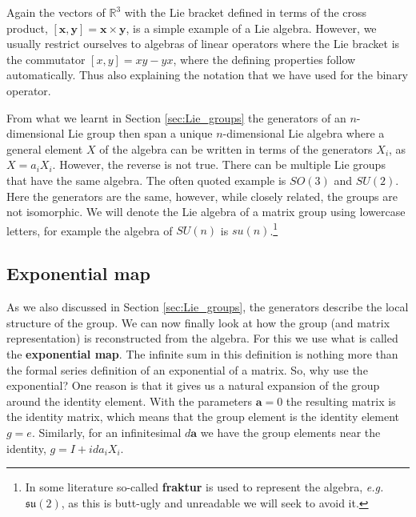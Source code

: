 \documentclass[notes.tex]{subfiles}
\begin{document}
Again the vectors of $\mathbb{R}^3$ with the Lie bracket defined in terms of the cross product, $[\mathbf x, \mathbf y]=\mathbf x \times \mathbf y$, is a simple example of a Lie algebra. However, we usually restrict ourselves to algebras of linear operators where the Lie bracket is the commutator $[x,y] = xy-yx$, where the defining properties follow automatically. Thus also explaining the notation that we have used for the binary operator. 

From what we learnt in Section \ref{sec:Lie_groups} the generators of an $n$-dimensional Lie group then span a unique $n$-dimensional Lie algebra where a general element $X$ of the algebra can be written in terms of the generators $X_i$, as $X=a_iX_i$. However, the reverse is not true. There can be multiple Lie groups that have the same algebra. The often quoted example is $SO(3)$ and $SU(2)$. Here the generators are the same, however, while closely related, the groups are not isomorphic. We will denote the Lie algebra of a matrix group using lowercase letters, for example the algebra of $SU(n)$ is $su(n)$.\footnote{In some literature so-called {\bf fraktur} is used to represent the algebra, {\it e.g.}\ $\mathfrak{su(2)}$, as this is butt-ugly and unreadable we will seek to avoid it. }

\subsection{Exponential map}
\label{sec:expmap}
As we also discussed in Section \ref{sec:Lie_groups}, the generators describe the local structure of the group.
We can now finally look at how the group (and matrix representation) is reconstructed from the algebra. For this we use what is called the {\bf exponential map}. 
The infinite sum in this definition is nothing more than the formal series definition of an exponential of a matrix. So, why use the exponential? One reason is that it gives us a natural expansion of the group around the identity element. With the parameters $\mathbf a=0$ the resulting matrix is the identity matrix, which means that the group element is the identity element $g=e$. Similarly, for an infinitesimal $d\mathbf a$ we have the group elements near the identity, $g=I+ida_iX_i$.
\end{document}
